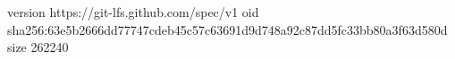 version https://git-lfs.github.com/spec/v1
oid sha256:63e5b2666dd77747cdeb45c57c63691d9d748a92c87dd5fc33bb80a3f63d580d
size 262240

